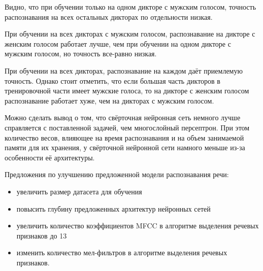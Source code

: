 Видно, что при обучении только на одном дикторе с мужским голосом, точность распознавания на всех остальных дикторах по отдельности низкая. 

При обучении на всех дикторах с мужским голосом, распознавание на дикторе с женским голосом работает лучше, чем при обучении на одном дикторе с мужским голосом, но точность все-равно низкая.

При обучении на всех дикторах, распознавание на каждом даёт приемлемую точность. Однако стоит отметить, что если большая часть дикторов в тренировочной части имеет мужские голоса, то на дикторе с женским голосом распознавание работает хуже, чем на дикторах с мужским голосом.

Можно сделать вывод о том, что свёрточная нейронная сеть немного лучше справляется с поставленной задачей, чем многослойный персептрон. При этом количество весов, влияющее на время распознавания и на объем занимаемой памяти для их хранения, у свёрточной нейронной сети намного меньше из-за особенности её архитектуры.

Предложения по улучшению предложенной модели распознавания речи:
\begin{itemize}[leftmargin=2cm]
	\item увеличить размер датасета для обучения
	\item повысить глубину предложенных архитектур нейронных сетей
	\item увеличить количество коэффициентов MFCC в алгоритме выделения речевых признаков до 13
	\item изменить количество мел-фильтров в алгоритме выделения речевых признаков.
\end{itemize}